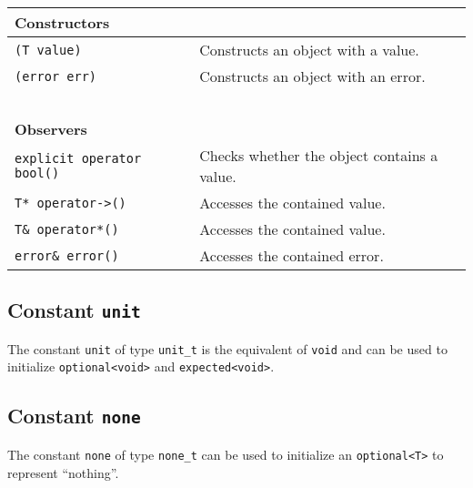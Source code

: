 \begin{center}\small
\begin{tabular}{ll}
  \textbf{Constructors} & ~ \\
  \hline
  \lstinline^(T value)^ & Constructs an object with a value. \\
  \hline
  \lstinline^(error err)^ & Constructs an object with an error. \\
  \hline
  ~ & ~ \\ \textbf{Observers} & ~ \\
  \hline
  \lstinline^explicit operator bool()^ & Checks whether the object contains a value. \\
  \hline
  \lstinline^T* operator->()^ & Accesses the contained value. \\
  \hline
  \lstinline^T& operator*()^ & Accesses the contained value. \\
  \hline
  \lstinline^error& error()^ & Accesses the contained error. \\
  \hline
\end{tabular}
\end{center}


\subsection{Constant \lstinline^unit^}

The constant \lstinline^unit^ of type \lstinline^unit_t^ is the equivalent of \lstinline^void^ and can be used to initialize \lstinline^optional<void>^ and \lstinline^expected<void>^.

\subsection{Constant \lstinline^none^}

The constant \lstinline^none^ of type \lstinline^none_t^ can be used to initialize an \lstinline^optional<T>^ to represent ``nothing''.